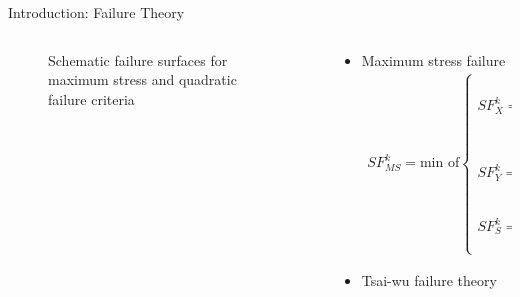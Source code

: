 \documentclass{beamer}
\begin{document}
\begin{frame}{Introduction: Failure Theory }
\begin{columns}[c]
    \begin{column}{0.4\textwidth}
		\begin{figure}
		\centering
		\caption{Schematic failure surfaces for maximum stress and quadratic failure
		criteria}
		\end{figure}
    \end{column}
    \begin{column}{0.6\textwidth}
		\begin{itemize}
			\item  Maximum stress failure
				\begingroup
				\small
				\begin{align*}
					SF_{MS}^k = \text{min of}
					\begin{cases}
						SF_X^k = 
						\begin{cases}
							\frac{X_t}{\sigma_{11}}, \text{ if } \sigma_{11}>0 \\
							\frac{X_c}{\sigma_{11}}, \text{ if } \sigma_{11}<0 \\
						\end{cases} \\
						SF_Y^k = 
						\begin{cases}
							\frac{Y_t}{\sigma_{22}}, \text{ if } \sigma_{22}>0 \\
							\frac{Y_c}{\sigma_{22}}, \text{ if } \sigma_{22}<0 \\
						\end{cases} \\
						SF_S^k =
						\begin{cases}
							\frac{S}{|\tau_{12}|} \\
						\end{cases} \\
					\end{cases} \textstyle{.}
				\end{align*}
				\endgroup
			\item  Tsai-wu failure theory


\end{itemize}
\end{column}
\end{columns}
\end{frame}
\end{document}
